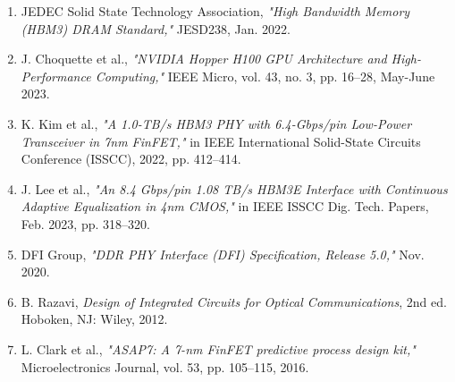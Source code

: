 \documentclass[journal,10pt,twocolumn]{IEEEtran}
\begin{document}
\begin{enumerate}
  \item JEDEC Solid State Technology Association, \textit{"High Bandwidth Memory (HBM3) DRAM Standard,"} JESD238, Jan. 2022.
  \item J. Choquette et al., \textit{"NVIDIA Hopper H100 GPU Architecture and High-Performance Computing,"} IEEE Micro, vol. 43, no. 3, pp. 16–28, May-June 2023.
  \item K. Kim et al., \textit{"A 1.0-TB/s HBM3 PHY with 6.4-Gbps/pin Low-Power Transceiver in 7nm FinFET,"} in IEEE International Solid-State Circuits Conference (ISSCC), 2022, pp. 412–414.
  \item J. Lee et al., \textit{"An 8.4 Gbps/pin 1.08 TB/s HBM3E Interface with Continuous Adaptive Equalization in 4nm CMOS,"} in IEEE ISSCC Dig. Tech. Papers, Feb. 2023, pp. 318–320.
  \item DFI Group, \textit{"DDR PHY Interface (DFI) Specification, Release 5.0,"} Nov. 2020.
  \item B. Razavi, \textit{Design of Integrated Circuits for Optical Communications}, 2nd ed. Hoboken, NJ: Wiley, 2012.
  \item L. Clark et al., \textit{"ASAP7: A 7-nm FinFET predictive process design kit,"} Microelectronics Journal, vol. 53, pp. 105–115, 2016.
\end{enumerate}
\end{document}
